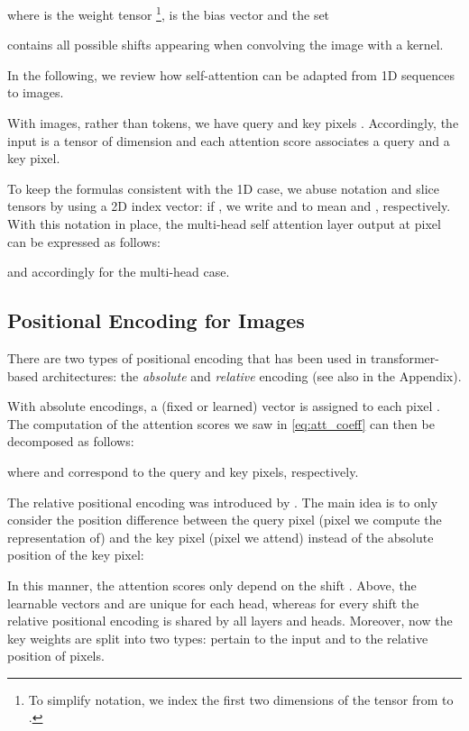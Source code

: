 \documentclass{article} \usepackage{iclr2020_conference,times}
\begin{document}
where  is the  weight tensor
\footnote{To simplify notation, we index the first two dimensions of the tensor from  to .},  is the bias vector and the set

contains all possible shifts appearing when convolving the image with a  kernel.





In the following, we review how self-attention can be adapted from 1D sequences to images.

With images, rather than tokens, we have query and key pixels . Accordingly, the input is a tensor  of dimension  and each
attention score associates a query and a key pixel. 

To keep the formulas consistent with the 1D case, we abuse notation and slice tensors by using a 2D index vector: if , we write  and  to mean  and , respectively.
With this notation in place, the multi-head self attention layer output at pixel  can be expressed as follows:

and accordingly for the multi-head case.



\subsection{Positional Encoding for Images}
\label{ssec:relative_position_encoding}

There are two types of positional encoding that has been used in transformer-based architectures: the \textit{absolute} and \textit{relative} encoding (see also  in the Appendix).

With absolute encodings, a (fixed or learned) vector  is assigned to each pixel . The computation of the attention scores we saw in \cref{eq:att_coeff} can then be decomposed as follows:

where  and  correspond to the query and key pixels, respectively.

The relative positional encoding was introduced by \cite{dai2019transformerxl}. The main idea is to only consider the position difference between the query pixel (pixel we compute the representation of) and the key pixel (pixel we attend) instead of the absolute position of the key pixel:

In this manner, the attention scores only depend on the shift .
Above, the learnable vectors  and  are unique for each head, whereas for every shift  the relative positional encoding  is shared by all layers and heads.
Moreover, now the key weights are split into two types:  pertain to the input and  to the relative position of pixels.
\end{document}

